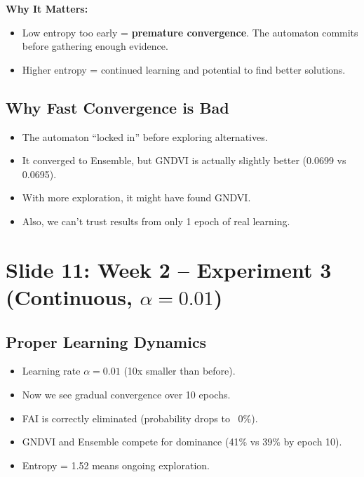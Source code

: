 \documentclass[11pt]{article}
\newenvironment{talkingpoints}{%
  \begin{itemize}[leftmargin=1.5em, itemsep=0.3em]
}{%
  \end{itemize}
}
\begin{document}
\textbf{Why It Matters:}
\begin{talkingpoints}
  \item Low entropy too early = \textbf{premature convergence}. The automaton commits before gathering enough evidence.
  \item Higher entropy = continued learning and potential to find better solutions.
\end{talkingpoints}

\subsection{Why Fast Convergence is Bad}

\begin{talkingpoints}
  \item The automaton ``locked in'' before exploring alternatives.
  \item It converged to Ensemble, but GNDVI is actually slightly better (0.0699 vs 0.0695).
  \item With more exploration, it might have found GNDVI.
  \item Also, we can't trust results from only 1 epoch of real learning.
\end{talkingpoints}

\section{Slide 11: Week 2 -- Experiment 3 (Continuous, $\alpha=0.01$)}

\subsection{Proper Learning Dynamics}

\begin{talkingpoints}
  \item Learning rate $\alpha = 0.01$ (10x smaller than before).
  \item Now we see gradual convergence over 10 epochs.
  \item FAI is correctly eliminated (probability drops to ~0\%).
  \item GNDVI and Ensemble compete for dominance (41\% vs 39\% by epoch 10).
  \item Entropy = 1.52 means ongoing exploration.
\end{talkingpoints}
\end{document}
